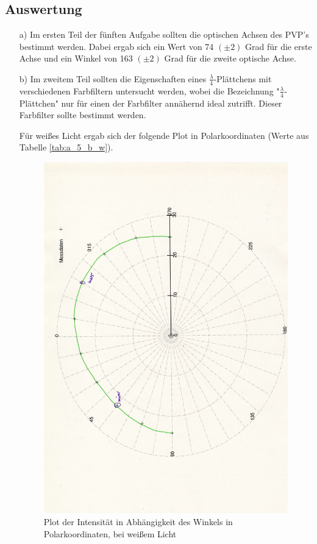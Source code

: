 \documentclass[12pt]{scrartcl}
\begin{document}
\subsection{Auswertung}
\begin{enumerate}
\item[a)]
Im ersten Teil der fünften Aufgabe sollten die optischen Achsen des PVP's bestimmt werden.
Dabei ergab sich ein Wert von 74 $(\pm 2)$ Grad für die erste Achse und ein Winkel von 163 $(\pm 2)$ Grad für die zweite optische Achse.

\item[b)]
Im zweitem Teil sollten die Eigenschaften eines $\frac{\lambda}{4}$-Plättchens mit verschiedenen Farbfiltern untersucht werden, wobei die Bezeichnung "$\frac{\lambda}{4}$-Plättchen" nur für einen der Farbfilter annähernd ideal zutrifft. Dieser Farbfilter sollte bestimmt werden.


Für weißes Licht ergab sich der folgende Plot in Polarkoordinaten (Werte aus Tabelle \ref{tab:a_5_b_w}).

\begin{figure}[H]
\centering
    \includegraphics[scale = 0.3, angle = -90]{a_5_w.pdf}
  	\caption[Plot der Intensität in Abhängigkeit des Winkels in Polarkoordinaten, bei weißem Licht]{Plot der Intensität in Abhängigkeit des Winkels in Polarkoordinaten, bei weißem Licht}
  \label{fig:a_5_w}
\end{figure}


\end{enumerate}
\end{document}
